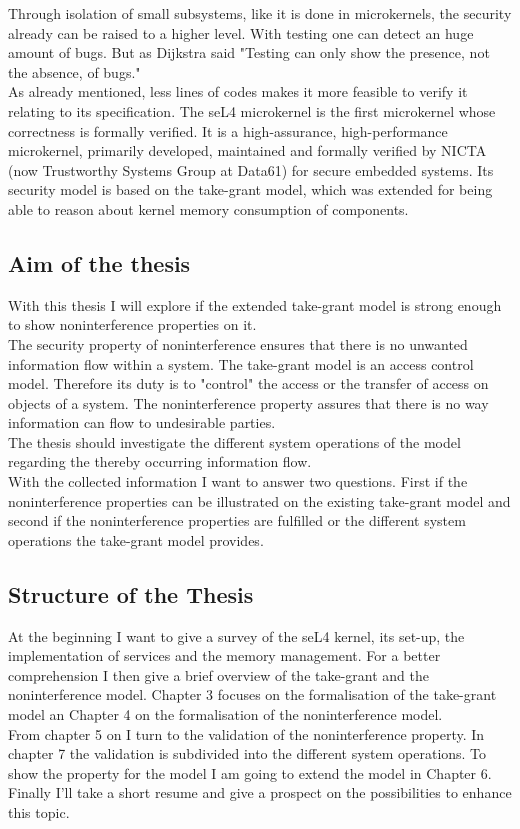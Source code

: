 Through isolation of small subsystems, like it is done in microkernels, the security already can be raised to a higher level. With testing one can detect an huge amount of bugs. But as Dijkstra said "Testing can only show the presence, not the absence, of bugs." \cite{EngTec} \\
As already mentioned, less lines of codes makes it more feasible to verify it relating to its specification. 
The seL4 microkernel is the first microkernel whose correctness is formally verified. It is a high-assurance, high-performance microkernel, primarily developed, maintained and formally verified by NICTA (now Trustworthy Systems Group at Data61) for secure embedded systems. Its security model is based on the take-grant model, which was extended for being able to reason about kernel memory consumption of components. 
	\subsection{Aim of the thesis}
	With this thesis I will explore if the extended take-grant model is strong enough to show noninterference properties on it. \\
	The security property of noninterference ensures that there is no unwanted information flow within a system. The take-grant model is an access control model. Therefore its duty is to "control" the access or the transfer of access on objects of a system. The noninterference property assures that there is no way information can flow to undesirable parties. \\
The thesis should investigate the different system operations of the model regarding the thereby occurring information flow. \\
With the collected information I want to answer two questions. First if the noninterference properties can be illustrated on the existing take-grant model and second if the noninterference properties are fulfilled or the different system operations the take-grant model provides. 
\subsection{Structure of the Thesis}
At the beginning I want to give a survey of the seL4 kernel, its set-up, the implementation of services and the memory management. For a better comprehension I then give a brief overview of the take-grant and the noninterference model. 
Chapter 3 focuses on the formalisation of the take-grant model an Chapter 4 on the formalisation of the noninterference model. \\
From chapter 5 on I turn to the validation of the noninterference property. In chapter 7 the validation is subdivided into the different system operations. To show the property for the model I am going to extend the model in Chapter 6. \\
Finally I'll take a short resume and give a prospect on the possibilities to enhance this topic.